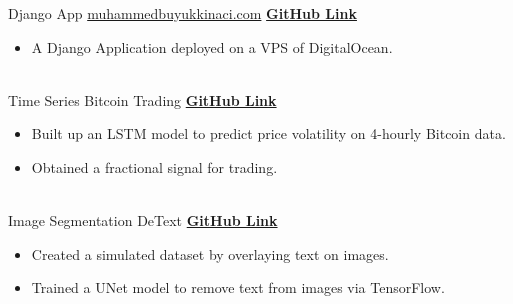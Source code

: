 \documentclass[letterpaper]{DS_class_file} %
\begin{document}
\begin{twenty} %
    
	\twentyitem
	{Django}
	{App}
	{\hspace{0.3cm}\href{https://muhammedbuyukkinaci.com}{muhammedbuyukkinaci.com}}
	{\href{https://github.com/MuhammedBuyukkinaci/muhammedbuyukkinaci.com}{\textbf{GitHub Link}}}
	{}
	{
		{\begin{itemize}
				\item A Django Application deployed on a VPS of DigitalOcean.
		\end{itemize}}
	}
	\\
	
	\twentyitem
	{Time}
	{Series}
	{\hspace{0.3cm}Bitcoin Trading}
	{\href{https://github.com/MuhammedBuyukkinaci/Bitcoin-Trading}{\textbf{GitHub Link}}}
	{}
	{
		{\begin{itemize}
				\item Built up an LSTM model to predict price volatility on 4-hourly Bitcoin data.
				\item Obtained a fractional signal for trading.
		\end{itemize}}
	}
	\\
	
	\twentyitem
	{Image}
	{Segmentation}
	{\hspace{0.3cm}DeText}
	{\href{https://github.com/MuhammedBuyukkinaci/DeText}{\textbf{GitHub Link}}}
	{}
	{
		{\begin{itemize}
				\item Created a simulated dataset by overlaying text on images.
				\item Trained a UNet model to remove text from images via TensorFlow.
		\end{itemize}}
	}
	\\
    

\end{twenty}
\end{document}
